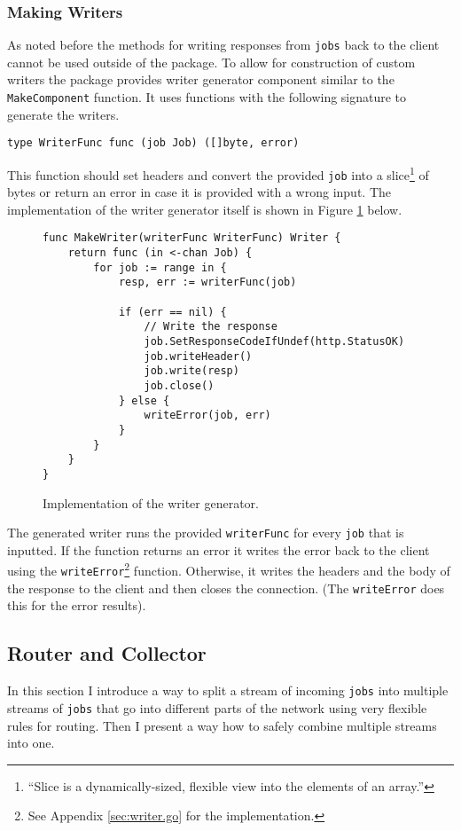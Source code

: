 \subsubsection{Making Writers}
As noted before the methods for writing responses from \texttt{jobs}
back to the client cannot be used outside of the package. To allow
for construction of custom writers the package provides writer generator
component similar to the \texttt{MakeComponent} function. It uses 
functions with the following signature to generate the writers.
\begin{lstlisting}
type WriterFunc func (job Job) ([]byte, error)
\end{lstlisting}
This function should set headers and convert the provided \texttt{job} into 
a slice\footnote{``Slice is a dynamically-sized, flexible view into the elements 
of an array.''\cite{tour}} of bytes or return an error in case it 
is provided with a 
wrong input. The implementation of the writer generator itself is shown
in Figure \ref{fig:MakeWriter} below.
\begin{figure}[h]
\centering
\begin{lstlisting}
func MakeWriter(writerFunc WriterFunc) Writer {
    return func (in <-chan Job) {
        for job := range in {
            resp, err := writerFunc(job)

            if (err == nil) {
                // Write the response
                job.SetResponseCodeIfUndef(http.StatusOK)
                job.writeHeader()
                job.write(resp)
                job.close()
            } else {
                writeError(job, err)
            }
        }       
    }
}
\end{lstlisting}
\caption[scale=1.0]{Implementation of the writer generator.}
\label{fig:MakeWriter}
\end{figure}

The generated writer runs the provided \texttt{writerFunc} for every \texttt{job} 
that is inputted. If the function returns an error it writes the error 
back to the client using the \texttt{writeError}\footnote{See Appendix 
\ref{sec:writer.go} for the implementation.} function. Otherwise, it 
writes the headers and the body of the response to the client and then 
closes the connection. (The \texttt{writeError} does this for the error
results).

\subsection{Router and Collector}
In this section I introduce a way to split a stream of incoming \texttt{jobs} into
multiple streams of \texttt{jobs} that go into different parts of the network
using very flexible rules for routing. Then I present a way how to
safely combine multiple streams into one.

